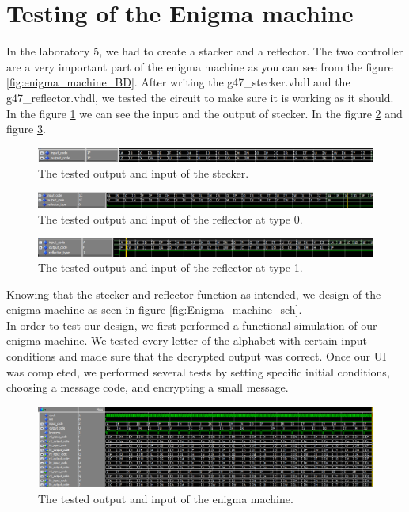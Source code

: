 \documentclass[10pt]{article}
\begin{document}
\section{Testing of the Enigma machine}
In the laboratory 5, we had to create a stacker and a reflector. The two controller are a very important part of the enigma machine as you can see from the figure \ref{fig:enigma_machine_BD}. After writing the g47\_stecker.vhdl and the g47\_reflector.vhdl, we tested the circuit to make sure it is working as it should. In the figure \ref{fig:stecker_test} we can see the input and the output of stecker. In the figure \ref{fig:refector_0_test} and figure \ref{fig:refector_1_test}.
\begin{figure}[!htb]
    \centering
    \includegraphics[width=1\textwidth]{./stecker_test.png}
    \caption{The tested output and input of the stecker.}
    \label{fig:stecker_test}
\end{figure}
\begin{figure}[!htb]
    \centering
    \includegraphics[width=1\textwidth]{./refector_0_test.png}
    \caption{The tested output and input of the reflector at type 0.}
    \label{fig:refector_0_test}
\end{figure}
\begin{figure}[!htb]
    \centering
    \includegraphics[width=1\textwidth]{./refector_1_test.png}
    \caption{The tested output and input of the reflector at type 1.}
    \label{fig:refector_1_test}
\end{figure}
Knowing that the stecker and reflector function as intended, we design of the enigma machine as seen in figure \ref{fig:Enigma_machine_sch}.\\ 
In order to test our design, we first performed a functional simulation of our enigma machine. We tested every letter of the alphabet with certain input conditions and made sure that the decrypted output was correct. Once our UI was completed, we performed several tests by setting specific initial conditions, choosing a message code, and encrypting a small message.
\begin{figure}[!htb]
    \centering
    \includegraphics[width=1\textwidth]{./enigma_machine_test.png}
    \caption{The tested output and input of the enigma machine.}
    \label{fig:enigma_machine_test}
\end{figure}
\end{document}
